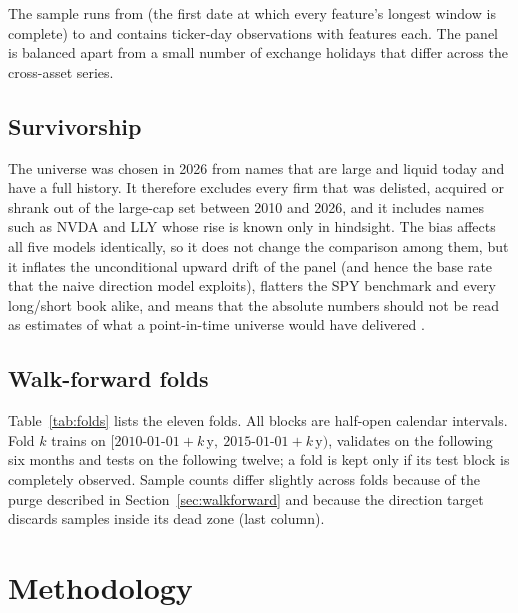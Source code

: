 \documentclass[10pt,a4paper,twoside,twocolumn]{article}
\begin{document}
The sample runs from \metadatastart{} (the first date at which every feature's longest window is complete) to \metadataend{} and contains \metanrows{} ticker-day observations with \metanfeatures{} features each. The panel is balanced apart from a small number of exchange holidays that differ across the cross-asset series.

\subsection{Survivorship}

The universe was chosen in 2026 from names that are large and liquid today and have a full history. It therefore excludes every firm that was delisted, acquired or shrank out of the large-cap set between 2010 and 2026, and it includes names such as NVDA and LLY whose rise is known only in hindsight. The bias affects all five models identically, so it does not change the comparison among them, but it inflates the unconditional upward drift of the panel (and hence the base rate that the naive direction model exploits), flatters the SPY benchmark and every long/short book alike, and means that the absolute numbers should not be read as estimates of what a point-in-time universe would have delivered \citep{shumway1997delisting}.

\subsection{Walk-forward folds}

Table~\ref{tab:folds} lists the eleven folds. All blocks are half-open calendar intervals. Fold $k$ trains on $[2010\text{-}01\text{-}01 + k\,\text{y},\ 2015\text{-}01\text{-}01 + k\,\text{y})$, validates on the following six months and tests on the following twelve; a fold is kept only if its test block is completely observed. Sample counts differ slightly across folds because of the purge described in Section~\ref{sec:walkforward} and because the direction target discards samples inside its dead zone (last column).

\begin{table}[t]
\centering\small
\caption{Walk-forward folds. $n$ counts ticker-day samples after purging; $n_{\text{test}}^{\text{dir}}$ is the number of test samples that carry a direction label.}
\label{tab:folds}

\end{table}

\section{Methodology}\label{sec:method}
\end{document}
